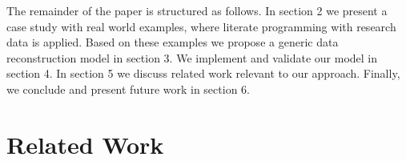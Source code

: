 \documentclass{acm_proc_article-sp}
\begin{document}
 
The remainder of the paper is structured as follows. 
In section 2 we present a case study with real world examples, where literate programming with research data is applied. 
Based on these examples we propose a generic data reconstruction model in section 3. 
We implement and validate our model in section 4. 
In section 5 we discuss related work relevant to our approach. 
Finally, we conclude and present future work in section 6.




















\section{Related Work}


\end{document}
